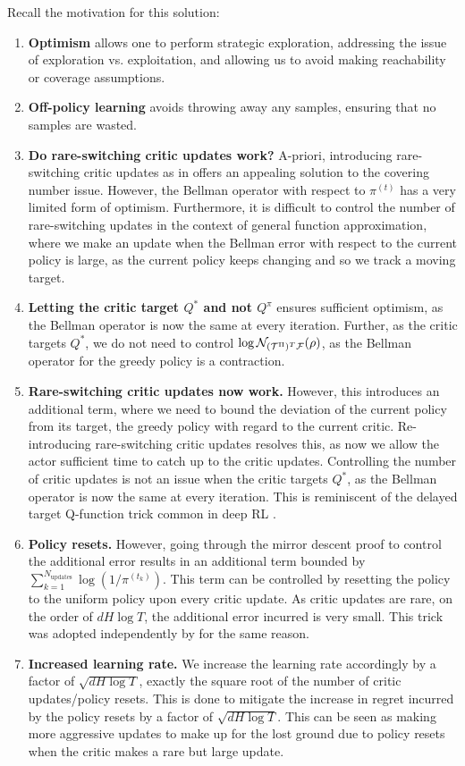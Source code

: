 Recall the motivation for this solution:
\begin{enumerate}
\itemsep0em 
    \item \textbf{Optimism} allows one to perform strategic exploration, addressing the issue of exploration vs. exploitation, and allowing us to avoid making reachability or coverage assumptions.
    \item \textbf{Off-policy learning} avoids throwing away any samples, ensuring that no samples are wasted.
    \item \textbf{Do rare-switching critic updates work?} A-priori, introducing rare-switching critic updates as in \citet{xiong2023generalframeworksequentialdecisionmaking} offers an appealing solution to the covering number issue. However, the Bellman operator with respect to $\pi^{(t)}$ has a very limited form of optimism. Furthermore, it is difficult to control the number of rare-switching updates in the context of general function approximation, where we make an update when the Bellman error with respect to the current policy is large, as the current policy keeps changing and so we track a moving target.
    \item \textbf{Letting the critic target $Q^*$ and not $Q^\pi$} ensures sufficient optimism, as the Bellman operator is now the same at every iteration. Further, as the critic targets $Q^*$, we do not need to control $\log {\mathcal{N}}_{({\mathcal{T}}^\Pi)^T {\mathcal{F}}}(\rho)$, as the Bellman operator for the greedy policy is a contraction. 
    \item \textbf{Rare-switching critic updates now work.} However, this introduces an additional term, where we need to bound the deviation of the current policy from its target, the greedy policy with regard to the current critic. Re-introducing rare-switching critic updates resolves this, as now we allow the actor sufficient time to catch up to the critic updates. Controlling the number of critic updates is not an issue when the critic targets $Q^*$, as the Bellman operator is now the same at every iteration. This is reminiscent of the delayed target Q-function trick common in deep RL \citep{lillicrap2015continuous, fujimoto2018addressing}.
    \item \textbf{Policy resets.} However, going through the mirror descent proof to control the additional error results in an additional term bounded by $\sum_{k=1}^{N_{\text{updates}}} \log(1/\pi^{(t_k)})$. This term can be controlled by resetting the policy to the uniform policy upon every critic update. As critic updates are rare, on the order of $dH\log T$, the additional error incurred is very small. This trick was adopted independently by \citet{cassel2024warm} for the same reason.
    \item \textbf{Increased learning rate.} We increase the learning rate accordingly by a factor of $\sqrt{dH\log T}$, exactly the square root of the number of critic updates/policy resets. This is done to mitigate the increase in regret incurred by the policy resets by a factor of $\sqrt{dH\log T}$. This can be seen as making more aggressive updates to make up for the lost ground due to policy resets when the critic makes a rare but large update. 
\end{enumerate} 
